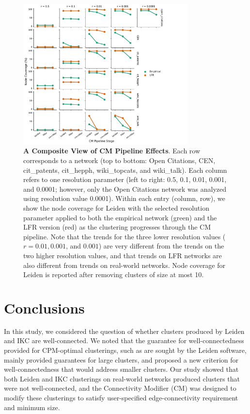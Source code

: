 \documentclass[11pt]{article}   	%
\begin{document}
\begin{figure}[h!]
\centering
\includegraphics[width=0.8\textwidth]{figs/cm_stats_trimmed.pdf}
\caption{\textbf{A Composite View of CM Pipeline Effects}. Each row corresponds to a network (top to bottom: Open Citations, CEN, cit\_patents, cit\_hepph, wiki\_topcats, and wiki\_talk). Each column refers to one resolution parameter (left to right: 0.5, 0.1, 0.01, 0.001, and 0.0001; however, only the Open Citations network was analyzed using resolution value 0.0001).
Within each entry (column, row), we show the node coverage for Leiden with the selected resolution parameter applied to both the empirical network (green) and the LFR version (red) as the clustering progresses through the CM pipeline. Note that the trends for the three lower resolution values ($r=0.01, 0.001$, and $0.001$) are very different from the trends on the two higher resolution values, and that trends on LFR networks are also different from trends on real-world networks.
Node coverage for Leiden is reported after removing clusters of size at most 10.}
\label{fig:composite-view}
\end{figure}



\section{Conclusions}
In this study, we considered the question of whether clusters produced by Leiden and IKC are well-connected. We noted that the guarantee for well-connectedness provided for CPM-optimal clusterings, such as are sought by the Leiden software, mainly provided guarantees for large clusters, and proposed a new criterion for well-connectedness that would address smaller clusters. Our study showed that both Leiden and IKC clusterings on real-world networks produced clusters that were not well-connected, and the Connectivity Modifier (CM) was designed to modify these clusterings to satisfy user-specified edge-connectivity requirement and minimum size.
\end{document}
